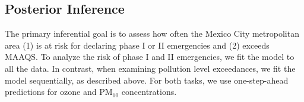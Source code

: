 \documentclass[alpha-refs]{wiley-article}
\begin{document}
\subsection{Posterior Inference}\label{sec:post_analysis}

The primary inferential goal is to assess how often the Mexico City metropolitan area (1) is at risk for declaring phase I or II emergencies and (2) exceeds MAAQS. 
To analyze the risk of phase I and II emergencies, we fit the model to all the data. In contrast, when examining pollution level exceedances, we fit the model sequentially, as described above. For both tasks, we use one-step-ahead predictions for ozone and $\text{PM}_{10}$ concentrations.
\end{document}

